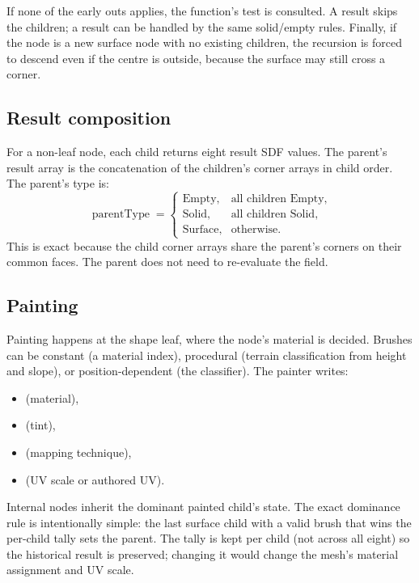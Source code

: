 If none of the early outs applies, the function's  test
is consulted.  A  result skips the children; a
 result can be handled by the same solid/empty rules.
Finally, if the node is a new surface node with no existing children, the
recursion is forced to descend even if the centre is outside, because the
surface may still cross a corner.

\subsection{Result composition}

For a non-leaf node, each child returns eight result SDF values.  The
parent's result array is the concatenation of the children's corner arrays
in child order.  The parent's type is:
\begin{equation}
  \operatorname{parentType} =
  \begin{cases}
    \text{Empty}, & \text{all children Empty},\\
    \text{Solid}, & \text{all children Solid},\\
    \text{Surface}, & \text{otherwise}.
  \end{cases}
\end{equation}
This is exact because the child corner arrays share the parent's corners
on their common faces.  The parent does not need to re-evaluate the field.

\subsection{Painting}

Painting happens at the shape leaf, where the node's material is decided.
Brushes can be constant (a material index), procedural (terrain
classification from height and slope), or position-dependent (the
 classifier).  The painter writes:
\begin{itemize}
\item {} (material),
\item {} (tint),
\item {} (mapping technique),
\item {} (UV scale or authored UV).
\end{itemize}
Internal nodes inherit the dominant painted child's state.  The exact
dominance rule is intentionally simple: the last surface child with a
valid brush that wins the per-child tally sets the parent.  The tally is
kept per child (not across all eight) so the historical result is
preserved; changing it would change the mesh's material assignment and UV
scale.

